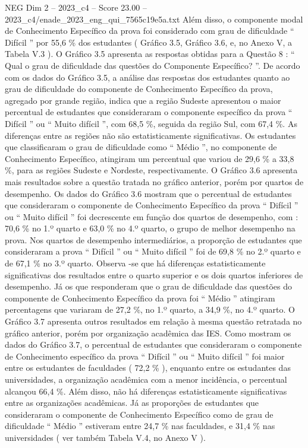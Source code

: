 \begin{textsample}{NEG Dim 2 – 2023\_c4 – Score 23.00 – 2023\_c4/enade\_2023\_eng\_qui\_7565c19e5a.txt}
Além disso, o componente modal de Conhecimento Específico da prova foi considerado com grau de dificuldade “ Difícil ” por 55,6 \% dos estudantes ( Gráfico 3.5, Gráfico 3.6, e, no Anexo V, a Tabela V.3 ).
O Gráfico 3.5 apresenta as respostas obtidas para a Questão 8 : “ Qual o grau de dificuldade das questões do Componente Específico? ”.
De acordo com os dados do Gráfico 3.5, a análise das respostas dos estudantes quanto ao grau de dificuldade do componente de Conhecimento Específico da prova, agregado por grande região, indica que a região Sudeste apresentou o maior percentual de estudantes que consideraram o componente específico da prova “ Difícil ” ou “ Muito difícil ”, com 68,5 \%, seguida da região Sul, com 67,4 \%.
As diferenças entre as regiões não são estatisticamente significativas.
Os estudantes que classificaram o grau de dificuldade como “ Médio ”, no componente de Conhecimento Específico, atingiram um percentual que variou de 29,6 \% a 33,8 \%, para as regiões Sudeste e Nordeste, respectivamente.
O Gráfico 3.6 apresenta mais resultados sobre a questão tratada no gráfico anterior, porém por quartos de desempenho.
Os dados do Gráfico 3.6 mostram que o percentual de estudantes que consideraram o componente de Conhecimento Específico da prova “ Difícil ” ou “ Muito difícil ” foi decrescente em função dos quartos de desempenho, com : 70,6 \% no 1.º quarto e 63,0 \% no 4.º quarto, o grupo de melhor desempenho na prova.
Nos quartos de desempenho intermediários, a proporção de estudantes que consideraram a prova “ Difícil ” ou “ Muito difícil ” foi de 69,8 \% no 2.º quarto e de 67,1 \% no 3.º quarto.
Observa -se que há diferenças estatisticamente significativas dos resultados entre o quarto superior e os dois quartos inferiores de desempenho.
Já os que responderam que o grau de dificuldade das questões do componente de Conhecimento Específico da prova foi “ Médio ” atingiram percentagens que variaram de 27,2 \%, no 1.º quarto, a 34,9 \%, no 4.º quarto.
O Gráfico 3.7 apresenta outros resultados em relação à mesma questão retratada no gráfico anterior, porém por organização acadêmica das IES.
Como mostram os dados do Gráfico 3.7, o percentual de estudantes que consideraram o componente de Conhecimento específico da prova “ Difícil ” ou “ Muito difícil ” foi maior entre os estudantes de faculdades ( 72,2 \% ), enquanto entre os estudantes das universidades, a organização acadêmica com a menor incidência, o percentual alcançou 66,4 \%.
Além disso, não há diferenças estatisticamente significativas entre as organizações acadêmicas.
Já as proporções de estudantes que consideraram o componente de Conhecimento Específico como de grau de dificuldade “ Médio ” estiveram entre 24,7 \% nas faculdades, e 31,4 \% nas universidades ( ver também Tabela V.4, no Anexo V ).

\end{textsample}
